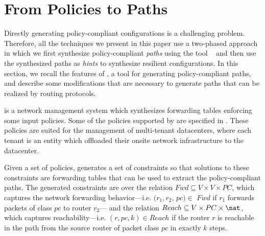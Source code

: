 \section{From Policies to Paths} \label{sec:genesis}
Directly generating policy-compliant configurations is a challenging
problem.
Therefore, all the techniques we present in this paper 
use a two-phased approach in which we first synthesize
policy-compliant \emph{paths} using the tool \genesis~\cite{genesis}
and then use the synthesized paths as \emph{hints} to synthesize resilient configurations. 
In this section, we recall the features of \genesis,
 a tool for generating policy-compliant paths, and describe
some modifications that are necessary to generate paths that
can be realized by routing protocols. 


\genesis is a network management
system which synthesizes forwarding tables enforcing some input policies. 
Some of the policies supported by \genesis are specified in 
. These policies are suited for the 
management of multi-tenant datacenters, where each tenant is 
an entity which offloaded their 
onsite network infrastructure to the datacenter. 

Given a set of policies, \genesis generates a set of constraints 
so that solutions to these constraints are forwarding
tables that can be used to extract the 
policy-compliant paths.
The generated constraints are over the relation $Fwd \subseteq V \times V \times PC$,
which captures
the network forwarding behavior---i.e. 
$(r_1, r_2$, $pc)\in$ $Fwd$ if 
$r_1$ forwards packets of class $pc$ to router $r_2$---
and 
the relation $Reach \subseteq V \times PC \times \nat$,
which captures
reachability---i.e. $(r, pc, k)\in Reach$ if 
the router $r$ is reachable in the path from the source
router of packet class $pc$ in exactly $k$ steps.

